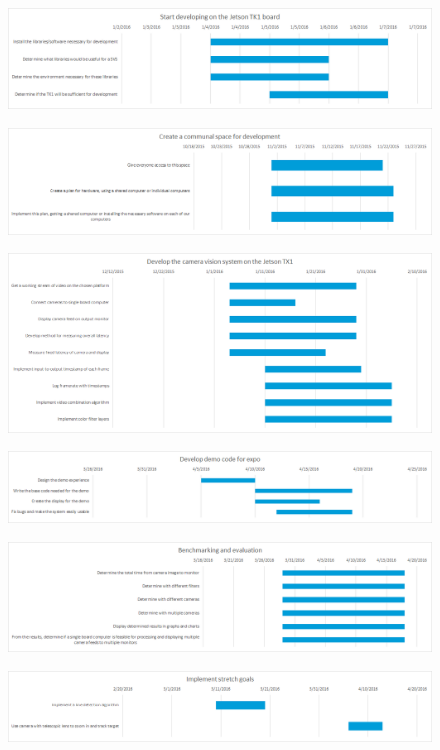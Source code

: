 \begin{figure}[H] 
\centering
\includegraphics[width=1.0\textwidth,natwidth=1210,natheight=642]{gantt/final/starting.png}  
\end{figure}
\begin{figure}[H] 
\centering
\includegraphics[width=1.0\textwidth,natwidth=1210,natheight=642]{gantt/final/communal.png}  
\end{figure}
\begin{figure}[H] 
\centering
\includegraphics[width=1.0\textwidth,natwidth=1210,natheight=642]{gantt/final/develop.png}  
\end{figure}
\begin{figure}[H] 
\centering
\includegraphics[width=1.0\textwidth,natwidth=1210,natheight=642]{gantt/final/algos.png}  
\end{figure}
\begin{figure}[H] 
\centering
\includegraphics[width=1.0\textwidth,natwidth=1210,natheight=642]{gantt/final/eval.png}  
\end{figure}
\begin{figure}[H] 
\centering
\includegraphics[width=1.0\textwidth,natwidth=1210,natheight=642]{gantt/final/stretch.png}  
\end{figure}
